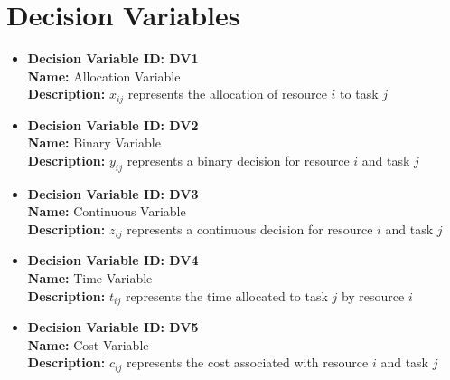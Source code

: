 \documentclass{article}
\begin{document}
\section{Decision Variables}
\begin{itemize}
    \item \textbf{Decision Variable ID: DV1} \\
    \textbf{Name:} Allocation Variable \\
    \textbf{Description:} $x_{ij}$ represents the allocation of resource $i$ to task $j$

    \item \textbf{Decision Variable ID: DV2} \\
    \textbf{Name:} Binary Variable \\
    \textbf{Description:} $y_{ij}$ represents a binary decision for resource $i$ and task $j$

    \item \textbf{Decision Variable ID: DV3} \\
    \textbf{Name:} Continuous Variable \\
    \textbf{Description:} $z_{ij}$ represents a continuous decision for resource $i$ and task $j$

    \item \textbf{Decision Variable ID: DV4} \\
    \textbf{Name:} Time Variable \\
    \textbf{Description:} $t_{ij}$ represents the time allocated to task $j$ by resource $i$

    \item \textbf{Decision Variable ID: DV5} \\
    \textbf{Name:} Cost Variable \\
    \textbf{Description:} $c_{ij}$ represents the cost associated with resource $i$ and task $j$
\end{itemize}
\end{document}
